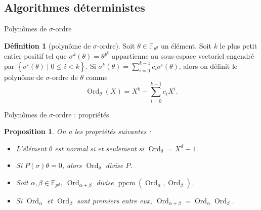 \documentclass[xcolor=x11names,compress]{beamer}
\theoremstyle{break}
\newtheorem{prop}[thm]{Proposition}
\theoremstyle{sc}
\theoremstyle{definition}
\newtheorem{defi}[thm]{Définition}
\theoremstyle{remark}
\DeclareMathOperator{\Ord}{Ord}
\DeclareMathOperator{\ppcm}{ppcm}
\begin{document}
\subsection{Algorithmes déterministes}
\begin{frame}{Polynômes de $\sigma$-ordre}
  \begin{defi}[polynôme de $\sigma$-ordre]
      Soit $\theta\in\mathbb{F}_{p^d}$ un élément. Soit $k$ le plus petit entier
      positif tel que $\sigma^k(\theta)=\theta^{p^k}$ appartienne au sous-espace
      vectoriel engendré par $\left\{ \sigma^i(\theta)\;|\;0\leq i<k \right\}$.
      Si $\sigma^k(\theta)=\sum_{i=0}^{k-1}c_i\sigma^i(\theta)$, alors on
      définit le polynôme de $\sigma$-ordre de $\theta$ comme
      \[
        \Ord_{\theta}(X)=X^k-\sum_{i=0}^{k-1}c_iX^i.
      \]
  \end{defi}
\end{frame}

\begin{frame}{Polynômes de $\sigma$-ordre : propriétés}
  \begin{prop}
   On a les propriétés suivantes :
   \begin{itemize}
     \item L'élément $\theta$ est normal si et seulement si $\Ord_\theta=X^d-1$.
     \item Si $P(\sigma)\theta = 0$, alors $\Ord_\theta$ divise $P$.
     \item Soit $\alpha,\beta\in\mathbb{F}_{p^d}$, $\Ord_{\alpha+\beta}$ divise
       $\ppcm(\Ord_\alpha, \Ord_\beta)$.
     \item Si $\Ord_\alpha$ et $\Ord_\beta$ sont premiers entre eux,
       $\Ord_{\alpha+\beta}=\Ord_\alpha\Ord_\beta$.
   \end{itemize}
  \end{prop}
\end{frame}
\end{document}
